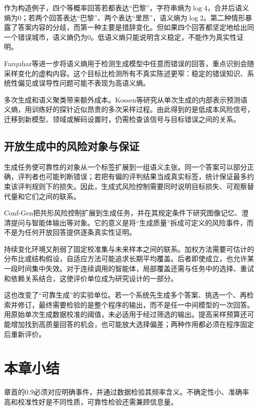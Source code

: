作为构造例子，四个等概率回答若都表达“巴黎”，字符串熵为$\log4$，合并后语义熵为0；若两个回答表达“巴黎”、两个表达“里昂”，语义熵为$\log2$。第二种情形暴露了答案内容的分歧，而第一种主要是措辞变化。但如果四个回答都坚定地给出同一个错误城市，语义熵仍为0。低语义熵只能说明含义稳定，不能作为真实性证明。

Farquhar等进一步将语义熵用于检测生成模型中任意而错误的回答，重点识别会随采样变化的虚构内容。这个目标比检测所有不真实陈述更窄：稳定的错误知识、系统性偏见或误导性问题可能不表现为高语义熵。

多次生成和语义聚类带来额外成本。Kossen等研究从单次生成的内部表示预测语义熵，用训练好的探针近似昂贵的多次采样过程。由此得到的是低成本风险信号，迁移到新模型、领域或解码设置时，仍需检查该信号与目标错误之间的关系。

\subsection{开放生成中的风险对象与保证}

生成任务使可靠性的对象从一个标签扩展到一组语义主张。同一个答案可以部分正确，评判者也可能判断错误；若把有偏的评判结果当成真实标签，统计保证最多约束该评判规则下的损失。因此，生成式风险控制需要同时说明目标损失、可观察替代量和它们之间的联系。

Conf-Gen把共形风险控制扩展到生成任务，并在其规定条件下研究图像记忆、澄清提问与智能体输出等对象。它的意义是将“生成质量”拆成可定义的风险事件，而不是为任何开放回答提供逐条真实性证明。

持续变化环境又削弱了固定校准集与未来样本之间的联系。加权方法需要可估计的分布比或结构假设，自适应方法可能追求长期平均覆盖。后者即使成立，也允许某一段时间集中失效。对于连续调用的智能体，局部覆盖还需与任务中的选择、重试和依赖关系结合，这使评价单位成为研究设计的一部分。

这也改变了“可靠生成”的实验单位。若一个系统先生成多个答案、挑选一个、再检索并修订，最终需要检验的是整个程序的输出，而不是任一中间模型的一次回答。用原始单次生成数据校准的阈值，未必适用于经过筛选的输出。提高采样预算还可能增加找到高质量回答的机会，也可能放大选择偏差；两种作用都必须在程序固定后重新评价。

\section{本章小结}
\label{sec:reliability-summary}

章首的0.9必须对应明确事件，并通过数据检验其频率含义。不确定性小、准确率高和校准性好是不同性质，可靠性检验还需兼顾信息量。

